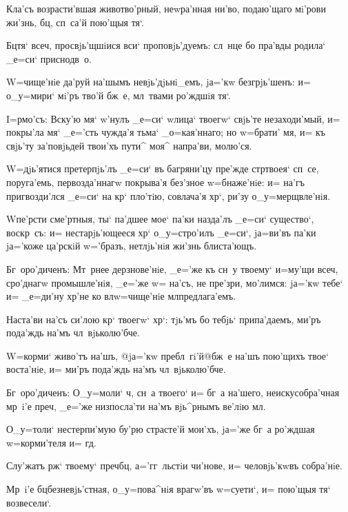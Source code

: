 
Кла'съ возрасти'вшая животво'рный, неwра'нная ни'во, 
подаю'щаго мi'рови жи'знь, бц, сп~са'й пою'щыя тя`.

Бц тя` всеч, просвjь'щшiися вси` 
проповjь'дуемъ: сл~нце бо пра'вды родила` _е=си` 
приснодв~о.

W=чище'нiе да'руй на'шымъ невjь'дjьнi_емъ, jа='кw 
безгрjь'шенъ: и= о_у=мири` мi'ръ тво'й бж~е, мл~твами 
ро'ждшiя тя`.


I=рмо'съ: Вску'ю мя` w'нулъ _е=си` w\т лица` 
твоегw` свjь'те незаходи'мый, и= покры'ла мя` _е='сть 
чужда'я тьма` _о=кая'ннаго; но w=брати' мя, и= къ свjь'ту 
за'повjьдей твои'хъ пути^ моя^ напра'ви, молю'ся.

W=дjь'ятися претерпjь'лъ _е=си` въ багряни'цу пре'жде 
стр твоея` сп~се, поруга'емь, первозда'ннагw 
покрыва'я без'зное w=бнаже'нiе: и= на'гъ 
пригвозди'лся _е=си` на кр` пло'тiю, совлача'я 
хр`, ри'зу о_у=мерщвле'нiя.

W\т пе'рсти сме'ртныя, ты` па'дшее мое` па'ки назда'лъ 
_е=си` существо`, воскр~съ: и= нестарjь'ющееся хр` 
о_у=стро'илъ _е=си`, jа=ви'въ па'ки jа='коже ца'рскiй 
w='бразъ, нетлjь'нiя жи'знь блиста'ющъ.

Бг~оро'диченъ: Мт~рнее дерзнове'нiе, _е='же къ сн~у 
твоему` и=му'щи всеч, сро'днагw промышле'нiя, _е='же 
w= на'съ, не пре'зри, мо'лимся: jа='кw тебе` и= _е=ди'ну 
хр'не ко вл w=чище'нiе мл предлага'емъ.


Наста'ви на'съ си'лою кр` твоегw` хр`: тjь'мъ 
бо тебjь` припа'даемъ, ми'ръ пода'ждь на'мъ 
чл~вjьколю'бче.

W=корми` живо'тъ на'шъ, @jа='кw пребл~гi'й@{бж~е 
на'шъ} пою'щихъ твое` воста'нiе, и= ми'ръ пода'ждь на'мъ 
чл~вjьколю'бче.

Бг~оро'диченъ: О_у=моли` ч, сн~а твоего` и= бг~а 
на'шего, неискусобра'чная мр~i'е преч, _е='же 
низпосла'ти на'мъ вjь^рнымъ ве'лiю мл.


О_у=толи` нестерпи'мую бу'рю страсте'й мои'хъ, jа='же 
бг~а ро'ждшая w=корми'теля и= гд.

Слу'жатъ рж` твоему` преч бц, 
а='гг~льстiи чи'нове, и= человjь'кwвъ собра'нiе.

Мр~i'е бц безневjь'стная, о_у=пова^нiя врагw'въ 
w=суети`, и= пою'щыя тя` возвесели`.

